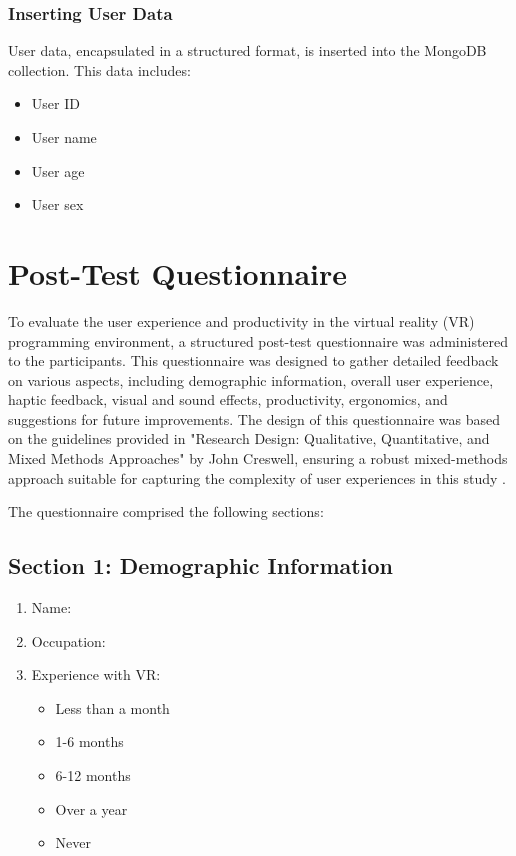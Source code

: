 \subsubsection{Inserting User Data}
User data, encapsulated in a structured format, is inserted into the MongoDB collection. This data includes:
\begin{itemize}
    \item User ID
    \item User name
    \item User age
    \item User sex
\end{itemize}
\section{Post-Test Questionnaire}

To evaluate the user experience and productivity in the virtual reality (VR) programming environment, a structured post-test questionnaire was administered to the participants. This questionnaire was designed to gather detailed feedback on various aspects, including demographic information, overall user experience, haptic feedback, visual and sound effects, productivity, ergonomics, and suggestions for future improvements. The design of this questionnaire was based on the guidelines provided in "Research Design: Qualitative, Quantitative, and Mixed Methods Approaches" by John Creswell, ensuring a robust mixed-methods approach suitable for capturing the complexity of user experiences in this study \cite{creswell2017research}. \clearpage

The questionnaire comprised the following sections:

\subsection{Section 1: Demographic Information}
\begin{enumerate}
    \item Name:
    \item Occupation:
    \item Experience with VR:
    \begin{itemize}
        \item Less than a month
        \item 1-6 months
        \item 6-12 months
        \item Over a year
        \item Never
    \end{itemize}
\end{enumerate}

